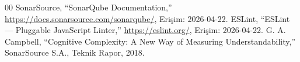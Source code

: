 \documentclass[conference]{IEEEtran}
\begin{document}
\begin{thebibliography}{00}
 SonarSource, ``SonarQube Documentation,''
  \url{https://docs.sonarsource.com/sonarqube/}, Erişim: 2026-04-22.
 ESLint, ``ESLint — Pluggable JavaScript Linter,''
  \url{https://eslint.org/}, Erişim: 2026-04-22.
 G. A. Campbell, ``Cognitive Complexity: A New Way of
  Measuring Understandability,'' SonarSource S.A., Teknik Rapor, 2018.
\end{thebibliography}
\end{document}
